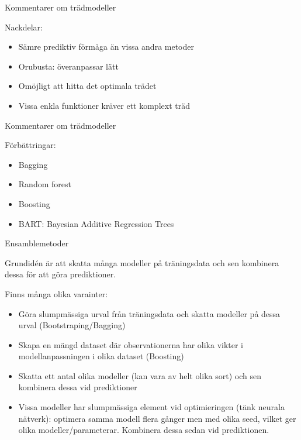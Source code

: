 \documentclass[10pt,english]{beamer}
\begin{document}
\begin{frame}{Kommentarer om trädmodeller}

    Nackdelar:
    \begin{itemize}
        \item Sämre prediktiv förmåga än vissa andra metoder
        \item Orubusta: överanpassar lätt
        \item Omöjligt att hitta det optimala trädet
        \item Vissa enkla funktioner kräver ett komplext träd
    \end{itemize}
\end{frame}



\begin{frame}{Kommentarer om trädmodeller}

    Förbättringar:
    \begin{itemize}
        \item Bagging
        \item Random forest
        \item Boosting
        \item BART: Bayesian Additive Regression Trees
    \end{itemize}
    
\end{frame}

\begin{frame}{Ensamblemetoder}
    
    Grundidén är att skatta många modeller på träningsdata och sen kombinera dessa för att göra prediktioner.
    
    Finns många olika varainter:
     \begin{itemize}
        \item Göra slumpmässiga urval från träningsdata och skatta modeller på dessa urval (Bootstraping/Bagging)
        \item Skapa en mängd dataset där observationerna har olika vikter i modellanpassningen i olika dataset (Boosting)
        \item Skatta ett antal olika modeller (kan vara av helt olika sort) och sen kombinera dessa vid prediktioner
        \item Vissa modeller har slumpmässiga element vid optimieringen (tänk neurala nätverk): optimera samma modell flera gånger men med olika seed, vilket ger olika modeller/parameterar. Kombinera dessa sedan vid prediktionen.
    \end{itemize}

\end{frame}
\end{document}

